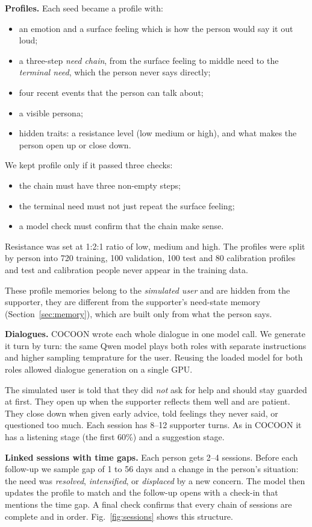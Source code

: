 \documentclass[journal]{IEEEtran}
\begin{document}
\textbf{Profiles.} Each seed became a profile with:
\begin{itemize}
\item an emotion and a surface feeling which is how the person would say it out loud;
\item a three-step \emph{need chain}, from the surface feeling to middle need to the \emph{terminal need}, which the person never says directly;
\item four recent events that the person can talk about;
\item a visible persona;
\item hidden traits: a resistance level (low medium or high), and what makes the person open up or close down.
\end{itemize}
We kept profile only if it passed three checks:
\begin{itemize}
\item the chain must have three non-empty steps;
\item the terminal need must not just repeat the surface feeling;
\item a model check must confirm that the chain make sense.
\end{itemize}
Resistance was set at 1:2:1 ratio of low, medium and high. The profiles were split by person into 720 training, 100 validation, 100 test and 80 calibration profiles and test and calibration people never appear in the training data.

These profile memories belong to the \emph{simulated user} and are hidden from the supporter, they are different from the supporter's need-state memory (Section~\ref{sec:memory}), which are built only from what the person says.

\textbf{Dialogues.} COCOON wrote each whole dialogue in one model call. We generate it turn by turn: the same Qwen model plays both roles with separate instructions and higher sampling temprature for the user. Reusing the loaded model for both roles allowed dialogue generation on a single GPU.

The simulated user is told that they did \emph{not} ask for help and should stay guarded at first. They open up when the supporter reflects them well and are patient. They close down when given early advice, told feelings they never said, or questioned too much. Each session has 8--12 supporter turns. As in COCOON it has a listening stage (the first 60\%) and a suggestion stage.

\textbf{Linked sessions with time gaps.} Each person gets 2--4 sessions. Before each follow-up we sample gap of 1 to 56 days and a change in the person's situation: the need was \emph{resolved}, \emph{intensified}, or \emph{displaced} by a new concern. The model then updates the profile to match and the follow-up opens with a check-in that mentions the time gap. A final check confirms that every chain of sessions are complete and in order. Fig.~\ref{fig:sessions} shows this structure.
\end{document}
